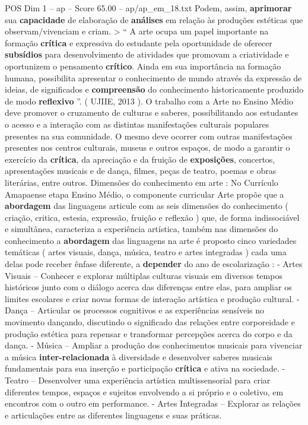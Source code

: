 \begin{textsample}{POS Dim 1 – ap – Score 65.00 – ap/ap\_em\_18.txt}
Podem, assim, \textbf{aprimorar} sua \textbf{capacidade} de elaboração de \textbf{análises} em relação às produções estéticas que observam/vivenciam e criam. > “ A arte ocupa um papel importante na formação \textbf{crítica} e expressiva do estudante pela oportunidade de oferecer \textbf{subsídios} para desenvolvimento de atividades que promovam a criatividade e oportunizem o pensamento \textbf{crítico}.
Ainda em sua importância na formação humana, possibilita apresentar o conhecimento de mundo através da expressão de ideias, de significados e \textbf{compreensão} do conhecimento historicamente produzido de modo \textbf{reflexivo} ”. ( UJIIE, 2013 ).
O trabalho com a Arte no Ensino Médio deve promover o cruzamento de culturas e saberes, possibilitando aos estudantes o acesso e a interação com as distintas manifestações culturais populares presentes na sua comunidade.
O mesmo deve ocorrer com outras manifestações presentes nos centros culturais, museus e outros espaços, de modo a garantir o exercício da \textbf{crítica}, da apreciação e da fruição de \textbf{exposições}, concertos, apresentações musicais e de dança, filmes, peças de teatro, poemas e obras literárias, entre outros.
Dimensões do conhecimento em arte : No Currículo Amapaense etapa Ensino Médio, o componente curricular Arte propõe que a \textbf{abordagem} das linguagens articule com as seis dimensões do conhecimento ( criação, critica, estesia, expressão, fruição e reflexão ) que, de forma indissociável e simultânea, caracteriza a experiência artística, também nas dimensões do conhecimento a \textbf{abordagem} das linguagens na arte é proposto cinco variedades temáticas ( artes visuais, dança, música, teatro e artes integradas ) cada uma delas pode receber ênfase diferente, a \textbf{depender} do ano de escolarização : - Artes Visuais – Conhecer e explorar múltiplas culturas visuais em diversos tempos históricos junto com o diálogo acerca das diferenças entre elas, para ampliar os limites escolares e criar novas formas de interação artística e produção cultural. - Dança – Articular os processos cognitivos e as experiências sensíveis no movimento dançando, discutindo o significado das relações entre corporeidade e produção estética para repensar e transformar percepções acerca do corpo e da dança. - Música – Ampliar a produção dos conhecimentos musicais para vivenciar a música \textbf{inter-relacionada} à diversidade e desenvolver saberes musicais fundamentais para sua inserção e participação \textbf{crítica} e ativa na sociedade. - Teatro – Desenvolver uma experiência artística multissensorial para criar diferentes tempos, espaços e sujeitos envolvendo a si próprio e o coletivo, em encontros com o outro em performance. - Artes Integradas – Explorar as relações e articulações entre as diferentes linguagens e suas práticas.

\end{textsample}

